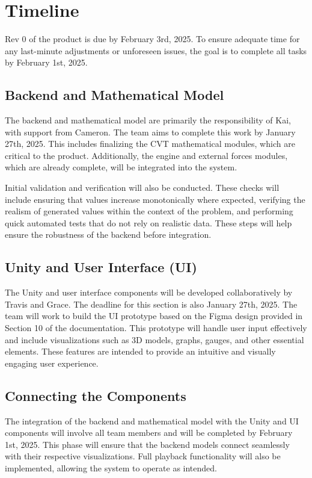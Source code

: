 \documentclass[12pt, titlepage]{article}
\begin{document}

\section{Timeline}

Rev 0 of the product is due by February 3rd, 2025. To ensure adequate time for any last-minute adjustments or unforeseen issues, the goal is to complete all tasks by February 1st, 2025.

\subsection*{Backend and Mathematical Model}
The backend and mathematical model are primarily the responsibility of Kai, with support from Cameron. The team aims to complete this work by January 27th, 2025. This includes finalizing the CVT mathematical modules, which are critical to the product. Additionally, the engine and external forces modules, which are already complete, will be integrated into the system.

Initial validation and verification will also be conducted. These checks will include ensuring that values increase monotonically where expected, verifying the realism of generated values within the context of the problem, and performing quick automated tests that do not rely on realistic data. These steps will help ensure the robustness of the backend before integration.

\subsection*{Unity and User Interface (UI)}
The Unity and user interface components will be developed collaboratively by Travis and Grace. The deadline for this section is also January 27th, 2025. The team will work to build the UI prototype based on the Figma design provided in Section 10 of the documentation. This prototype will handle user input effectively and include visualizations such as 3D models, graphs, gauges, and other essential elements. These features are intended to provide an intuitive and visually engaging user experience.

\subsection*{Connecting the Components}
The integration of the backend and mathematical model with the Unity and UI components will involve all team members and will be completed by February 1st, 2025. This phase will ensure that the backend models connect seamlessly with their respective visualizations. Full playback functionality will also be implemented, allowing the system to operate as intended.
\end{document}
